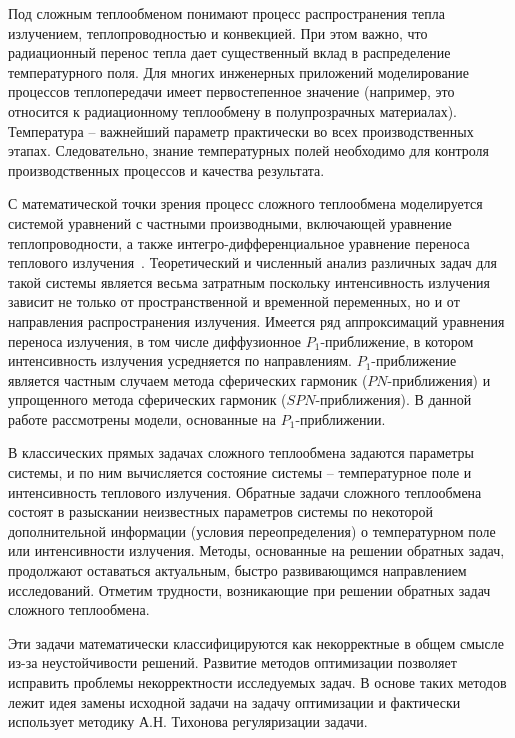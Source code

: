     {\actuality}
    Под сложным теплообменом понимают
    процесс распространения тепла излучением, теплопроводностью и
    конвекцией.
    При этом важно, что радиационный перенос тепла дает
    существенный вклад в распределение температурного поля.
    Для многих инженерных приложений моделирование процессов теплопередачи имеет
    первостепенное значение (например, это относится к радиационному
    теплообмену в полупрозрачных материалах).
    Температура – важнейший параметр практически во всех производственных этапах.
    Следовательно, знание температурных полей необходимо для контроля производственных
    процессов и качества результата.

    С математической точки зрения процесс сложного теплообмена
    моделируется системой уравнений с частными производными, включающей
    уравнение теплопроводности, а также интегро-дифференциальное уравнение
    переноса теплового излучения~\cite{Ozisik1976, Sparrow1971, howell2010thermal, modest2013radiative}.
    Теоретический и численный анализ различных задач для такой системы является весьма
    затратным поскольку интенсивность излучения зависит не только от
    пространственной и временной переменных, но и от направления
    распространения излучения.
    Имеется ряд аппроксимаций уравнения переноса излучения, в том числе диффузионное
    $P_1$-приближение, в котором интенсивность излучения усредняется по направлениям.
    $P_1$-приближение является частным случаем метода сферических гармоник ($PN$-приближения)
    и упрощенного метода сферических гармоник ($SPN$-приближения).
    В данной работе рассмотрены модели, основанные на $P_1$-приближении.


    В классических прямых задачах сложного теплообмена задаются
    параметры системы, и по ним вычисляется состояние системы –
    температурное поле и интенсивность теплового излучения.
    Обратные задачи сложного теплообмена состоят в разыскании неизвестных параметров
    системы по некоторой дополнительной информации (условия переопределения)
    о температурном поле или интенсивности излучения.
    Методы, основанные на решении обратных задач, продолжают оставаться
    актуальным, быстро развивающимся направлением исследований.
    Отметим трудности, возникающие при решении обратных задач сложного
    теплообмена.


    Эти задачи математически классифицируются как некорректные в общем
    смысле из-за неустойчивости решений.
    Развитие методов оптимизации позволяет исправить проблемы некорректности исследуемых задач.
    В основе таких методов лежит идея замены исходной задачи на задачу оптимизации и
    фактически использует методику А.Н. Тихонова регуляризации задачи.

